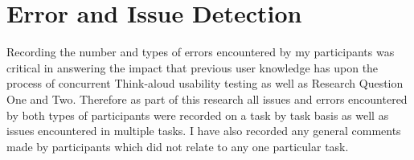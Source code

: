 \section{Error and Issue Detection}
Recording the number and types of errors encountered by my participants was critical in answering the impact that previous user knowledge has upon the process of concurrent Think-aloud usability testing as well as Research Question One and Two. Therefore as part of this research all issues and errors encountered by both types of participants were recorded on a task by task basis as well as issues encountered in multiple tasks. I have also recorded any general comments made by participants which did not relate to any one particular task. 
